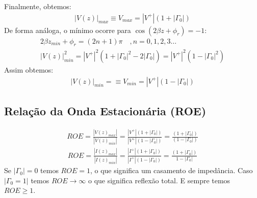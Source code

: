\documentclass[11pt,a4paper]{article}
\begin{document}
Finalmente, obtemos:
\begin{align*}
  \left| V(z) \right|_{max} \equiv V_{max} = \left| V^+ \right| \left( 1+ \left| \Gamma_0 \right| \right)
\end{align*}
De forma análoga, o mínimo ocorre para $ \cos \left( 2 \beta z + \phi_r \right)= -1$:
\begin{align*}
  2 \beta z_{min} + \phi_r = \left( 2n +1 \right)\pi \quad , n=0,1,2,3 \ldots \\
  \left| V(z) \right|^2_{min} = \left| V^+ \right|^2 \left( 1+ \left| \Gamma_0 \right|^2 - 2 \left| \Gamma_0 \right| \right) = \left| V^+ \right|^2 \left( 1 - \left| \Gamma_0 \right|^2 \right)
\end{align*}
Assim obtemos:
\begin{align*}
  \left| V(z) \right|_{min} = \equiv V_{min} = \left| V^+ \right|(1- \left| \Gamma_0 \right|)
\end{align*}
\subsection{Relação da Onda Estacionária (ROE)}
\begin{align*}
  ROE = \frac{ \left| V(z)_{max} \right| }{ \left| V(z)_{min} \right| }= \frac{ \left| V^+ \right| \left( 1 + \left| \Gamma_0 \right| \right) }{ \left| V^+ \right| \left( 1- \left| \Gamma_0 \right| \right) } = \frac{ \left( 1+ \left| \Gamma_0 \right| \right) }{ \left( 1 - \left| \Gamma_0 \right| \right)}
\end{align*}
\begin{align*}
  ROE = \frac{ \left| I(z)_{max} \right| }{ \left| I(z)_{min} \right|} = \frac{ \left| I^+ \right| \left( 1+ \left| \Gamma_0 \right| \right) }{ \left| I^+ \right| \left( 1- \left| \Gamma_0 \right| \right) }= \frac{ \left( 1+ \left| \Gamma_0 \right|\right) }{1 - \left| \Gamma_0 \right|}
\end{align*}
Se $ \left| \Gamma_0 \right|=0$ temos $ROE=1$, o que significa um casamento de impedância. Caso $ \left| \Gamma_0 =1 \right|$ temos $ROE \to \infty$ o que significa reflexão total. E sempre temos $ROE \geq 1$.
\end{document}

